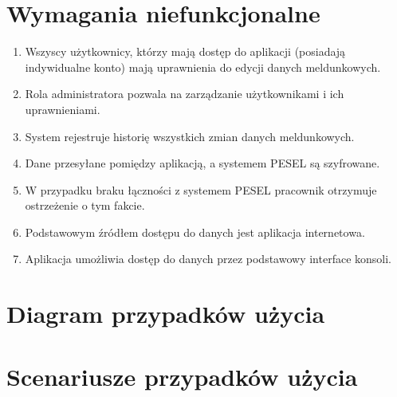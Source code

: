 \documentclass[12pt]{article}
\begin{document}
\section{Wymagania niefunkcjonalne}
\begin{enumerate}
    \item Wszyscy użytkownicy, którzy mają dostęp do aplikacji (posiadają indywidualne konto) mają uprawnienia do edycji danych meldunkowych.
    \item Rola administratora pozwala na zarządzanie użytkownikami i ich uprawnieniami.
    \item System rejestruje historię wszystkich zmian danych meldunkowych.
    \item Dane przesyłane pomiędzy aplikacją, a systemem PESEL są szyfrowane.
    \item W przypadku braku łączności z systemem PESEL pracownik otrzymuje ostrzeżenie o tym fakcie.
    \item Podstawowym źródłem dostępu do danych jest aplikacja internetowa.
    \item Aplikacja umożliwia dostęp do danych przez podstawowy interface konsoli.
\end{enumerate}
\newpage
\section{Diagram przypadków użycia}

\section{Scenariusze przypadków użycia}
\end{document}
